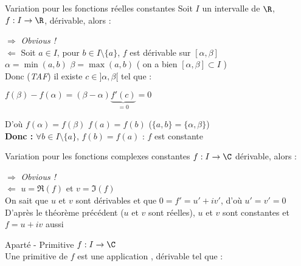 \documentclass[12pt,a4paper]{report}
\begin{document}
\begin{theoreme}{Variation pour les fonctions réelles constantes}{}
Soit $I$ un intervalle de $\R$, $f:I\to \R$, dérivable, alors :
\begin{center}
\end{center}
\end{theoreme}

\begin{demo}
$\Longrightarrow$ \textit{Obvious !}\\
$\Longleftarrow$ Soit $a\in I$, pour $b \in I\setminus \lbrace a \rbrace$, $f$ est dérivable sur $[\alpha,\beta]$\\
$\alpha = \min(a,b)$ \: \: \: \: \: $\beta = \max(a,b)$ \: \: \: \: \: ( on a bien $[\alpha,\beta] \subset I$ )\\
Donc (\textit{TAF}) il existe $c \in ]\alpha,\beta[$ tel que :
\begin{center}
    $f(\beta)-f(\alpha)=(\beta-\alpha)\underbrace{f'(c)}_{=0}=0$
\end{center}
D'où $f(\alpha)=f(\beta)$ \ie $f(a)=f(b)$ ($\lbrace a,b \rbrace =\lbrace \alpha, \beta \rbrace$)\\
\textbf{Donc :} $\forall b \in I\setminus \lbrace a \rbrace$, $f(b)=f(a)$ : $f$ est constante
\end{demo}

\begin{corollaire}{Variation pour les fonctions complexes constantes}{}
$f:I \to \C$ dérivable, alors : 
\begin{center}
\end{center}
\end{corollaire}

\begin{demo}
$\Longrightarrow$ \textit{Obvious !}\\
$\Longleftarrow$ $u=\Re(f)$ et $v=\Im(f)$ \\
On sait que $u$ et $v$ sont dérivables et que $0=f'=u'+iv'$, d'où $u'=v'=0$\\
D'après le théorème précédent ($u$ et $v$ sont réelles), $u$ et $v$ sont constantes et $f=u+iv$ aussi
\end{demo}

\begin{definition}{Aparté - Primitive}{}
$f:I \to \C$\\
Une primitive de $f$ est une application , dérivable tel que : 
\end{definition}
\end{document}
